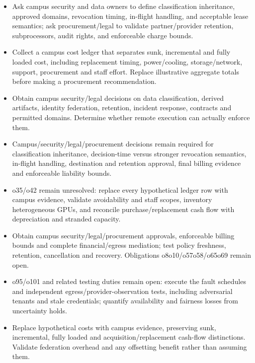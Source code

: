\documentclass[11pt]{article}
\begin{document}
\begin{itemize}
\item Ask campus security and data owners to define classification inheritance, approved domains, revocation timing, in-flight handling, and acceptable lease semantics; ask procurement/legal to validate partner/provider retention, subprocessors, audit rights, and enforceable charge bounds.
\item Collect a campus cost ledger that separates sunk, incremental and fully loaded cost, including replacement timing, power/cooling, storage/network, support, procurement and staff effort. Replace illustrative aggregate totals before making a procurement recommendation.
\item Obtain campus security/legal decisions on data classification, derived artifacts, identity federation, retention, incident response, contracts and permitted domains. Determine whether remote execution can actually enforce them.
\item Campus/security/legal/procurement decisions remain required for classification inheritance, decision-time versus stronger revocation semantics, in-flight handling, destination and retention approval, final billing evidence and enforceable liability bounds.
\item o35/o42 remain unresolved: replace every hypothetical ledger row with campus evidence, validate avoidability and staff scopes, inventory heterogeneous GPUs, and reconcile purchase/replacement cash flow with depreciation and stranded capacity.
\item Obtain campus security/legal/procurement approvals, enforceable billing bounds and complete financial/egress mediation; test policy freshness, retention, cancellation and recovery. Obligations o8\textendash{}o10/o57\textendash{}o58/o65\textendash{}o69 remain open.
\item o95/o101 and related testing duties remain open: execute the fault schedules and independent egress/provider-observation tests, including adversarial tenants and stale credentials; quantify availability and fairness losses from uncertainty holds.
\item Replace hypothetical costs with campus evidence, preserving sunk, incremental, fully loaded and acquisition/replacement cash-flow distinctions. Validate federation overhead and any offsetting benefit rather than assuming them.
\end{itemize}
\end{document}
